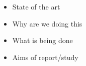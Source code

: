 \begin{itemize}
	\item State of the art
	\item Why are we doing this
	\item What is being done
	\item Aims of report/study
\end{itemize}
